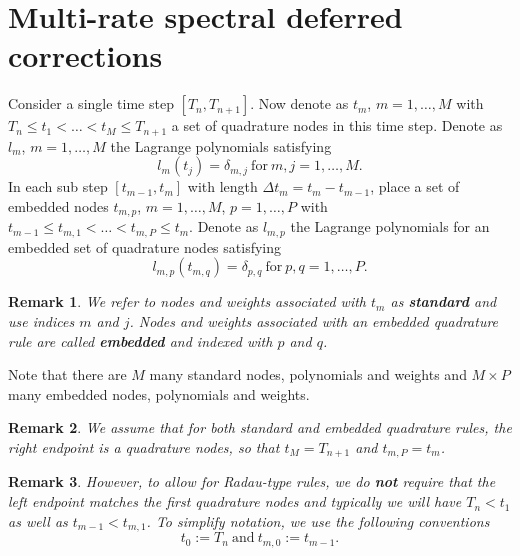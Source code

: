 \documentclass{article}
\newtheorem{remark}{Remark}
\begin{document}
\section*{Multi-rate spectral deferred corrections}
Consider a single time step $[T_{n}, T_{n+1}]$.
Now denote as $t_m$, $m=1, \ldots, M$ with $T_{n} \leq t_1 < \ldots < t_{M} \leq T_{n+1}$ a set of quadrature nodes in this time step.
Denote as $l_m$, $m=1, \ldots, M$ the Lagrange polynomials satisfying 
\begin{equation}
	l_m(t_j) = \delta_{m,j} \ \text{for} \ m,j=1, \ldots, M.
\end{equation}
In each sub step $[t_{m-1}, t_{m}]$ with length $\Delta t_{m}=t_{m}-t_{m-1}$, place a set of embedded nodes $t_{m,p}$, $m=1,\ldots,M$, $p=1,\ldots,P$ with $t_{m-1} \leq t_{m,1} < \ldots < t_{m,P} \leq t_{m}$.
Denote as $l_{m,p}$ the Lagrange polynomials for an embedded set of quadrature nodes satisfying
\begin{equation}
	l_{m,p}(t_{m,q}) = \delta_{p,q} \ \text{for} \ p,q=1,\ldots,P.
\end{equation}
\begin{remark}
We refer to nodes and weights associated with $t_m$ as \textbf{standard} and use indices $m$ and $j$.
Nodes and weights associated with an embedded quadrature rule are called \textbf{embedded} and indexed with $p$ and $q$.
\end{remark}
Note that there are $M$ many standard nodes, polynomials and weights and $M \times P$ many embedded nodes, polynomials and weights.
\begin{remark}
We assume that for both standard and embedded quadrature rules, the right endpoint is a quadrature nodes, so that $t_{M} = T_{n+1}$ and $t_{m,P} = t_{m}$.
\end{remark}
\begin{remark}
However, to allow for Radau-type rules, we do \textbf{not} require that the left endpoint matches the first quadrature nodes and typically we will have $T_n < t_1$ as well as $t_{m-1} < t_{m,1}$.
To simplify notation, we use the following conventions
\begin{equation}
	t_0 := T_n \ \text{and} \ t_{m,0} := t_{m-1}.
\end{equation}
\end{remark}
\end{document}
